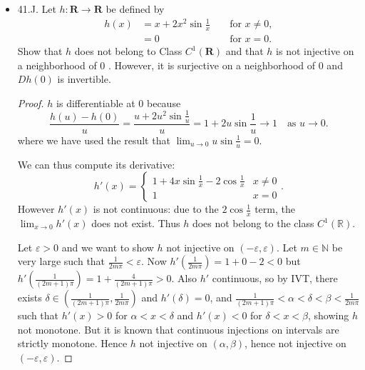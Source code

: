 \begin{itemize}
\begin{proof}
	Finally we verify $Df(0)$ is not injective or surjective. Since $Df(0)(x) = 0^3 + 3 x^2 = 3 x^2$,
	\begin{itemize}
		\item $Df(0)$ not injective, because $Df(0)(1) = Df(0)(-1) = 3$ 
		\item $Df(0)$ not surjective, because $Df(0)(x) = 3x^2 \ge 0$, i.e. $Df(0)$ not attaining negative values.
	\end{itemize}
\end{proof}

	\item 41.J. Let $h: \boldsymbol{R} \rightarrow \boldsymbol{R}$ be defined by
\[
\begin{aligned}
h(x) & =x+2 x^2 \sin \frac{1}{x} & & \text { for } x \neq 0, \\
& =0 & & \text { for } x=0 .
\end{aligned}
\]
Show that $h$ does not belong to Class $C^1(\boldsymbol{R})$ and that $h$ is not injective on a neighborhood of 0 . However, it is surjective on a neighborhood of 0 and $D h(0)$ is invertible.
\begin{proof}
	$h$ is differentiable at $0$ because
	\[
		\frac{h(u) - h(0)}{u}  = \frac{u + 2 u^2 \sin \frac{1}{u}}{u} = 1 + 2 u \sin \frac{1}{u} \to 1 \quad \text{as } u\to 0
	.\]
	where we have used the result that $\lim_{u \to 0} u \sin \frac{1}{u} = 0$.

	We can thus compute its derivative:
	\[
		h'(x) = \begin{cases}
			1 + 4x \sin \frac{1}{x} - 2 \cos \frac{1}{x} & x \neq  0\\
			1 & x = 0
		\end{cases}	.\] 
	However $h'(x)$ is not continuous: due to the $2 \cos \frac{1}{x}$ term, the $\lim_{x \to 0} h'(x)$ does not exist. Thus $h$ does not belong to the class $C^1(\mathbb{R})$.

	Let $\varepsilon>0$ and we want to show $h$ not injective on $(-\varepsilon, \varepsilon)$. Let $m \in \mathbb{N}$ be very large such that $\frac{1}{2m \pi} < \varepsilon$. Now $h'(\frac{1}{2 m \pi}) = 1 + 0 - 2 < 0$ but $h'(\frac{1}{(2 m + 1) \pi}) = 1 + \frac{4}{(2 m + 1) \pi} > 0$. Also $h'$ continuous, so by IVT, there exists $\delta \in (\frac{1}{(2 m + 1)\pi}, \frac{1}{2m \pi})$ and $h'(\delta) = 0$, and $\frac{1}{(2m+1)\pi} < \alpha < \delta < \beta < \frac{1}{2m \pi}$ such that $h'(x) > 0$ for $\alpha < x < \delta$ and $h'(x) < 0$ for $\delta < x < \beta$, showing $h$ not monotone. But it is known that continuous injections on intervals are strictly monotone. Hence $h$ not injective on $(\alpha, \beta)$, hence not injective on $(-\varepsilon, \varepsilon)$.


\end{proof}
\end{itemize}
